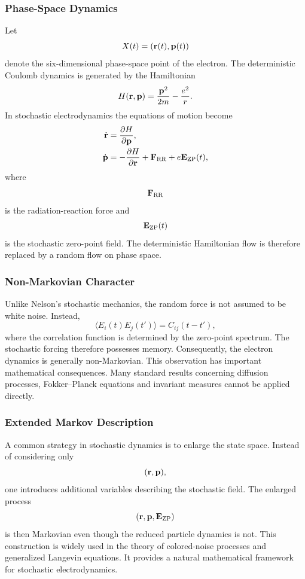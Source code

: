 \subsubsection{Phase-Space Dynamics}
Let
\[X(t)=({\bf r}(t),{\bf p}(t))\]
denote the six-dimensional phase-space point of the electron.
The deterministic Coulomb dynamics is generated by the Hamiltonian
\begin{equation}
H({\bf r},{\bf p})=\frac{{\bf p}^2}{2m}-\frac{e^2}{r}.
\end{equation}
In stochastic electrodynamics the equations of motion become
\begin{align}
\dot{\bf r}&=\frac{\partial H}{\partial{\bf p}},\\
\dot{\bf p}&=-\frac{\partial H}{\partial{\bf r}}+
{\bf F}_{\rm RR}+e{\bf E}_{\rm ZP}(t),
\label{eq:SEDPhaseSpace}
\end{align}
where
\[{\bf F}_{\rm RR}\]
is the radiation-reaction force and
\[{\bf E}_{\rm ZP}(t)\]
is the stochastic zero-point field.
The deterministic Hamiltonian flow is therefore replaced by a random
flow on phase space.
\subsubsection{Non-Markovian Character}
Unlike Nelson's stochastic mechanics, the random force is not assumed to
be white noise.
Instead,
\[\langle E_i(t)E_j(t')\rangle=C_{ij}(t-t'),\]
where the correlation function is determined by the zero-point spectrum.
The stochastic forcing therefore possesses memory.
Consequently,
the electron dynamics is generally non-Markovian.
This observation has important mathematical consequences.
Many standard results concerning diffusion processes, Fokker--Planck
equations and invariant measures cannot be applied directly.
\subsubsection{Extended Markov Description}
A common strategy in stochastic dynamics is to enlarge the state space.
Instead of considering only
\[({\bf r},{\bf p}),\]
one introduces additional variables describing the stochastic field.
The enlarged process
\[({\bf r},{\bf p},{\bf E}_{\rm ZP})\]
is then Markovian even though the reduced particle dynamics is not.
This construction is widely used in the theory of colored-noise
processes and generalized Langevin equations.
It provides a natural mathematical framework for stochastic
electrodynamics.
